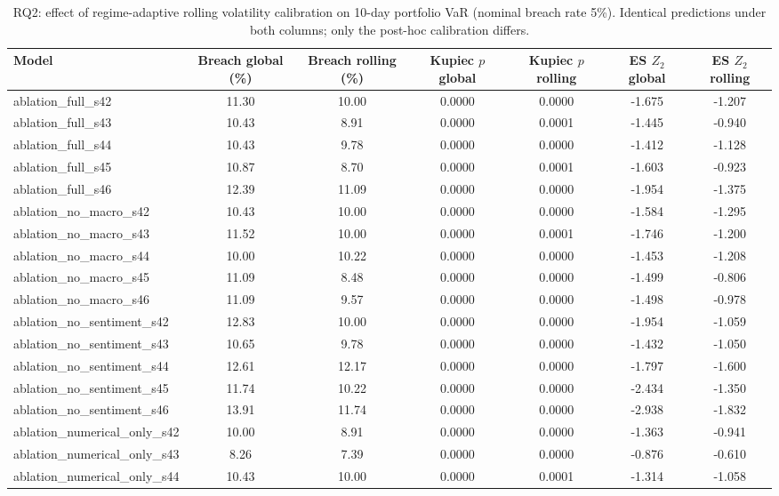 \begin{table}
\caption{RQ2: effect of regime-adaptive rolling volatility calibration on 10-day portfolio VaR (nominal breach rate 5\%). Identical predictions under both columns; only the post-hoc calibration differs.}
\label{tab:calibration}
\begin{tabular}{lcccccc}
\toprule
Model & Breach global (\%) & Breach rolling (\%) & Kupiec $p$ global & Kupiec $p$ rolling & ES $Z_2$ global & ES $Z_2$ rolling \\
\midrule
ablation_full_s42 & 11.30 & 10.00 & 0.0000 & 0.0000 & -1.675 & -1.207 \\
ablation_full_s43 & 10.43 & 8.91 & 0.0000 & 0.0001 & -1.445 & -0.940 \\
ablation_full_s44 & 10.43 & 9.78 & 0.0000 & 0.0000 & -1.412 & -1.128 \\
ablation_full_s45 & 10.87 & 8.70 & 0.0000 & 0.0001 & -1.603 & -0.923 \\
ablation_full_s46 & 12.39 & 11.09 & 0.0000 & 0.0000 & -1.954 & -1.375 \\
ablation_no_macro_s42 & 10.43 & 10.00 & 0.0000 & 0.0000 & -1.584 & -1.295 \\
ablation_no_macro_s43 & 11.52 & 10.00 & 0.0000 & 0.0001 & -1.746 & -1.200 \\
ablation_no_macro_s44 & 10.00 & 10.22 & 0.0000 & 0.0000 & -1.453 & -1.208 \\
ablation_no_macro_s45 & 11.09 & 8.48 & 0.0000 & 0.0000 & -1.499 & -0.806 \\
ablation_no_macro_s46 & 11.09 & 9.57 & 0.0000 & 0.0000 & -1.498 & -0.978 \\
ablation_no_sentiment_s42 & 12.83 & 10.00 & 0.0000 & 0.0000 & -1.954 & -1.059 \\
ablation_no_sentiment_s43 & 10.65 & 9.78 & 0.0000 & 0.0000 & -1.432 & -1.050 \\
ablation_no_sentiment_s44 & 12.61 & 12.17 & 0.0000 & 0.0000 & -1.797 & -1.600 \\
ablation_no_sentiment_s45 & 11.74 & 10.22 & 0.0000 & 0.0000 & -2.434 & -1.350 \\
ablation_no_sentiment_s46 & 13.91 & 11.74 & 0.0000 & 0.0000 & -2.938 & -1.832 \\
ablation_numerical_only_s42 & 10.00 & 8.91 & 0.0000 & 0.0000 & -1.363 & -0.941 \\
ablation_numerical_only_s43 & 8.26 & 7.39 & 0.0000 & 0.0000 & -0.876 & -0.610 \\
ablation_numerical_only_s44 & 10.43 & 10.00 & 0.0000 & 0.0001 & -1.314 & -1.058 \\

\end{tabular}
\end{table}
